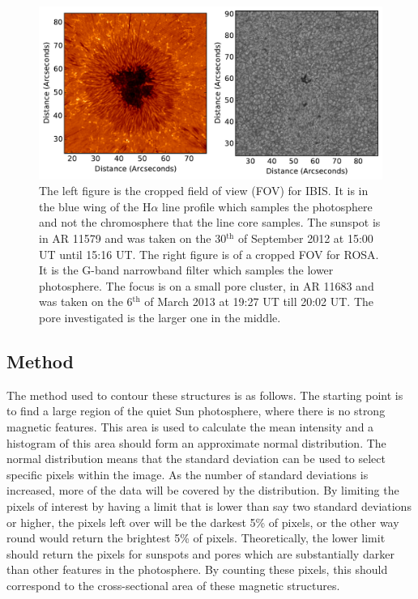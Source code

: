     \begin{figure}
        \centering
        \includegraphics[width=\textwidth]{overview.pdf}
        \caption{
                The left figure is the cropped field of view (FOV) for IBIS.
                It is in the blue wing of the H$\alpha$ line profile which samples the photosphere and not the chromosphere that the line core samples.
                The sunspot is in AR 11579 and was taken on the 30$^{\mathrm{th}}$ of September 2012 at 15:00 UT until 15:16 UT.
                The right figure is of a cropped FOV for ROSA.
                It is the G-band narrowband filter which samples the lower photosphere.
                The focus is on a small pore cluster, in AR 11683 and was taken on the 6$^{\mathrm{th}}$ of March 2013 at 19:27 UT till 20:02 UT.
                The pore investigated is the larger one in the middle.
                }
        \label{fig:data_overview}
    \end{figure}
    
    \subsection{Method}
        
    The method used to contour these structures is as follows.
    The starting point is to find a large region of the quiet Sun photosphere, where there is no strong magnetic features.
    This area is used to calculate the mean intensity and a histogram of this area should form an approximate normal distribution.
    The normal distribution means that the standard deviation can be used to select specific pixels within the image.
    As the number of standard deviations is increased, more of the data will be covered by the distribution.
    By limiting the pixels of interest by having a limit that is lower than say two standard deviations or higher, the pixels left over will be the darkest 5\% of pixels, or the other way round would return the brightest 5\% of pixels.
    Theoretically, the lower limit should return the pixels for sunspots and pores which are substantially darker than other features in the photosphere.
    By counting these pixels, this should correspond to the cross-sectional area of these magnetic structures.
    
